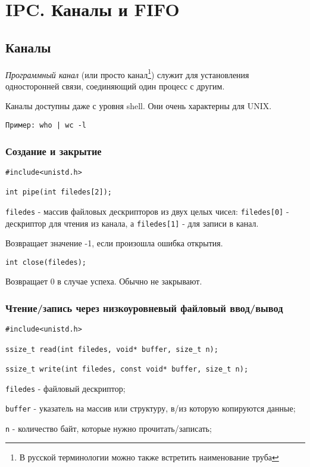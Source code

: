 \chapter{IPC. Каналы и FIFO}

\section{Каналы}

\emph{Программный канал} (или просто канал\footnote{В русской терминологии можно также встретить наименование труба}) служит для установления односторонней связи, соединяющий один процесс с другим.

Каналы доступны даже с уровня shell. Они очень характерны для UNIX.

\verb+Пример: who | wc -l+

\subsection{Создание и закрытие}
\begin{verbatim}
#include<unistd.h>

int pipe(int filedes[2]);
\end{verbatim}

\verb+filedes+ - массив файловых дескрипторов из двух целых чисел: \verb+filedes[0]+ - дескриптор для чтения из канала, а \verb+filedes[1]+ - для записи в канал.

Возвращает значение -1, если произошла ошибка открытия.

\verb+int close(filedes);+

Возвращает 0 в случае успеха. Обычно не закрывают.

\subsection{Чтение/запись через низкоуровневый файловый ввод/вывод}

\begin{verbatim}
#include<unistd.h>

ssize_t read(int filedes, void* buffer, size_t n);

ssize_t write(int filedes, const void* buffer, size_t n);
\end{verbatim}
\verb+filedes+ - файловый дескриптор;

\verb+buffer+ - указатель на массив или структуру, в/из которую копируются
данные;

\verb+n+ - количество байт, которые нужно прочитать/записать;


